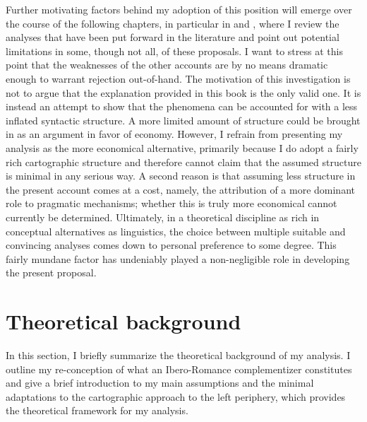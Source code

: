 Further motivating factors behind my adoption of this position will emerge over the course of the following chapters, in particular in   and , where I review the  analyses that have been put forward in the literature and point out  potential limitations in some, though not all, of these proposals. I want to stress at this point that  the  weaknesses of the other accounts  are  by no means  dramatic enough to warrant rejection out-of-hand.  The motivation of this investigation is not to argue that the  explanation provided in this book is the only valid one. It is instead an attempt to show that the phenomena can be accounted for with a less inflated syntactic structure. A more limited amount of structure could be brought in as an argument in favor of economy. However, I refrain from presenting my analysis as the more economical alternative,  primarily because I do adopt a fairly rich cartographic structure  and therefore cannot claim that the assumed structure is minimal in any serious way. A second reason is that assuming less structure in the present account comes at a cost, namely, the attribution of a more dominant role to pragmatic mechanisms;   whether this is truly more economical cannot currently be determined.   Ultimately,  in a theoretical discipline as rich in conceptual alternatives as linguistics, the choice between multiple suitable and convincing analyses comes down to personal preference to some degree. This fairly  mundane factor has undeniably played a non-negligible  role in  developing the present proposal.

\section{Theoretical background}\label{sec:intconcept}\largerpage
In this section, I briefly summarize the theoretical background of my analysis. I outline  my re-conception of what an Ibero-Romance complementizer constitutes and give a brief introduction to my main assumptions and  the minimal adaptations to the cartographic approach to the left periphery, which provides the theoretical framework for my analysis.

